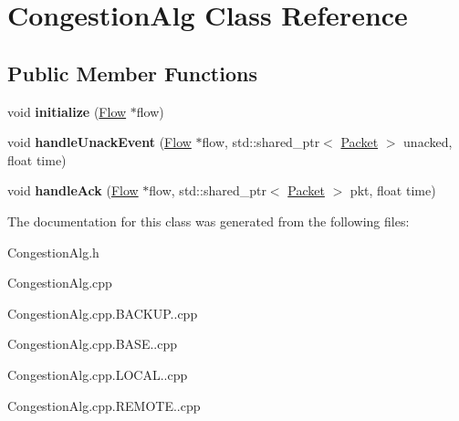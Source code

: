\hypertarget{classCongestionAlg}{\section{\-Congestion\-Alg \-Class \-Reference}
\label{classCongestionAlg}
}
\subsection*{\-Public \-Member \-Functions}
\begin{DoxyCompactItemize}
\item 
\hypertarget{classCongestionAlg_a9f9c7b919053bc680f72f30afacba8c0}{void {\bfseries initialize} (\hyperlink{classFlow}{\-Flow} $\ast$flow)}\label{classCongestionAlg_a9f9c7b919053bc680f72f30afacba8c0}

\item 
\hypertarget{classCongestionAlg_af38f56763c73836b7a1528ceb85dbf7c}{void {\bfseries handle\-Unack\-Event} (\hyperlink{classFlow}{\-Flow} $\ast$flow, std\-::shared\-\_\-ptr$<$ \hyperlink{classPacket}{\-Packet} $>$ unacked, float time)}\label{classCongestionAlg_af38f56763c73836b7a1528ceb85dbf7c}

\item 
\hypertarget{classCongestionAlg_a6411b58a5608f9345e38bc35635e681b}{void {\bfseries handle\-Ack} (\hyperlink{classFlow}{\-Flow} $\ast$flow, std\-::shared\-\_\-ptr$<$ \hyperlink{classPacket}{\-Packet} $>$ pkt, float time)}\label{classCongestionAlg_a6411b58a5608f9345e38bc35635e681b}

\end{DoxyCompactItemize}


\-The documentation for this class was generated from the following files\-:\begin{DoxyCompactItemize}
\item 
\-Congestion\-Alg.\-h\item 
\-Congestion\-Alg.\-cpp\item 
\-Congestion\-Alg.\-cpp.\-B\-A\-C\-K\-U\-P..\-cpp\item 
\-Congestion\-Alg.\-cpp.\-B\-A\-S\-E..\-cpp\item 
\-Congestion\-Alg.\-cpp.\-L\-O\-C\-A\-L..\-cpp\item 
\-Congestion\-Alg.\-cpp.\-R\-E\-M\-O\-T\-E..\-cpp\end{DoxyCompactItemize}
